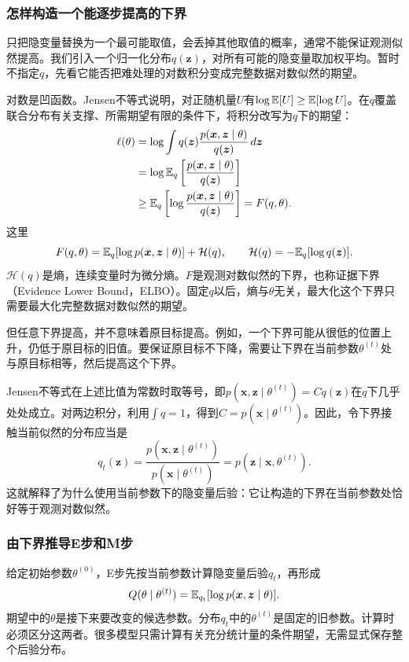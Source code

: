 \subsubsection{怎样构造一个能逐步提高的下界}
只把隐变量替换为一个最可能取值，会丢掉其他取值的概率，通常不能保证观测似然提高。我们引入一个归一化分布$q(\bm z)$，对所有可能的隐变量取加权平均。暂时不指定$q$，先看它能否把难处理的对数积分变成完整数据对数似然的期望。

对数是凹函数。Jensen不等式说明，对正随机量$U$有$\log\mathbb{E}[U]\geq\mathbb{E}[\log U]$。在$q$覆盖联合分布有关支撑、所需期望有限的条件下，将积分改写为$q$下的期望：
\begin{align}
 \ell(\theta)
 &=\log\int q(\bm z)\frac{p(\bm x,\bm z\mid\theta)}{q(\bm z)}\,d\bm z\\
 &=\log\mathbb{E}_q\left[\frac{p(\bm x,\bm z\mid\theta)}{q(\bm z)}\right]\\
 &\geq\mathbb{E}_q\left[\log\frac{p(\bm x,\bm z\mid\theta)}{q(\bm z)}\right]
 =F(q,\theta).
 \label{eq:solving-em-jensen}
\end{align}
这里
\begin{equation}
 F(q,\theta)=\mathbb{E}_q[\log p(\bm x,\bm z\mid\theta)]+\mathcal H(q),\qquad
 \mathcal H(q)=-\mathbb{E}_q[\log q(\bm z)].
\end{equation}
$\mathcal H(q)$是熵，连续变量时为微分熵。$F$是观测对数似然的下界，也称证据下界（Evidence Lower Bound，ELBO）。固定$q$以后，熵与$\theta$无关，最大化这个下界只需要最大化完整数据对数似然的期望。

但任意下界提高，并不意味着原目标提高。例如，一个下界可能从很低的位置上升，仍低于原目标的旧值。要保证原目标不下降，需要让下界在当前参数$\theta^{(t)}$处与原目标相等，然后提高这个下界。

Jensen不等式在上述比值为常数时取等号，即$p(\bm x,\bm z\mid\theta^{(t)})=Cq(\bm z)$在$q$下几乎处处成立。对两边积分，利用$\int q=1$，得到$C=p(\bm x\mid\theta^{(t)})$。因此，令下界接触当前似然的分布应当是
\begin{equation}
 q_t(\bm z)=\frac{p(\bm x,\bm z\mid\theta^{(t)})}{p(\bm x\mid\theta^{(t)})}
 =p(\bm z\mid\bm x,\theta^{(t)}).
\end{equation}
这就解释了为什么使用当前参数下的隐变量后验：它让构造的下界在当前参数处恰好等于观测对数似然。

\subsubsection{由下界推导E步和M步}
给定初始参数$\theta^{(0)}$，E步先按当前参数计算隐变量后验$q_t$，再形成
\begin{equation}
 Q(\theta\mid\theta^{(t)})=\mathbb{E}_{q_t}[\log p(\bm x,\bm z\mid\theta)].
 \label{eq:solving-em-q}
\end{equation}
期望中的$\theta$是接下来要改变的候选参数。分布$q_t$中的$\theta^{(t)}$是固定的旧参数。计算时必须区分这两者。很多模型只需计算有关充分统计量的条件期望，无需显式保存整个后验分布。

